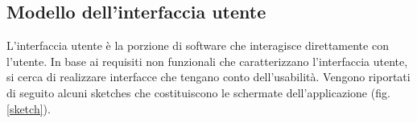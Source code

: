 \subsection{Modello dell'interfaccia utente}
L'interfaccia utente è la porzione di software che interagisce direttamente con l'utente.
In base ai requisiti non funzionali che caratterizzano l'interfaccia utente, si cerca di realizzare interfacce che tengano conto dell'usabilità.
Vengono riportati di seguito alcuni sketches che costituiscono le schermate dell'applicazione (fig. \ref{sketch}).
\begin{figure}[h!]

\end{figure}

